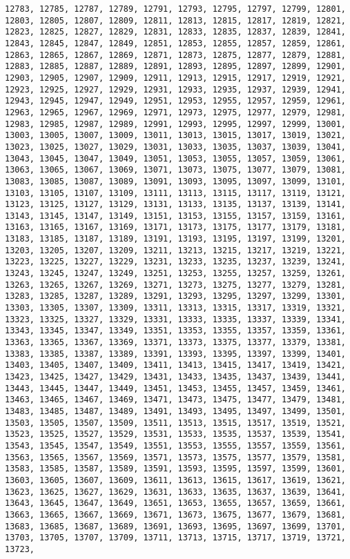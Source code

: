 \documentclass[11pt]{article}
\begin{document}
\begin{Verbatim}[commandchars=\\\{\}]
12783, 12785, 12787, 12789, 12791, 12793, 12795, 12797, 12799, 12801, 12803, 12805, 12807, 12809, 12811, 12813, 12815, 12817, 12819, 12821, 12823, 12825, 12827, 12829, 12831, 12833, 12835, 12837, 12839, 12841, 12843, 12845, 12847, 12849, 12851, 12853, 12855, 12857, 12859, 12861, 12863, 12865, 12867, 12869, 12871, 12873, 12875, 12877, 12879, 12881, 12883, 12885, 12887, 12889, 12891, 12893, 12895, 12897, 12899, 12901, 12903, 12905, 12907, 12909, 12911, 12913, 12915, 12917, 12919, 12921, 12923, 12925, 12927, 12929, 12931, 12933, 12935, 12937, 12939, 12941, 12943, 12945, 12947, 12949, 12951, 12953, 12955, 12957, 12959, 12961, 12963, 12965, 12967, 12969, 12971, 12973, 12975, 12977, 12979, 12981, 12983, 12985, 12987, 12989, 12991, 12993, 12995, 12997, 12999, 13001, 13003, 13005, 13007, 13009, 13011, 13013, 13015, 13017, 13019, 13021, 13023, 13025, 13027, 13029, 13031, 13033, 13035, 13037, 13039, 13041, 13043, 13045, 13047, 13049, 13051, 13053, 13055, 13057, 13059, 13061, 13063, 13065, 13067, 13069, 13071, 13073, 13075, 13077, 13079, 13081, 13083, 13085, 13087, 13089, 13091, 13093, 13095, 13097, 13099, 13101, 13103, 13105, 13107, 13109, 13111, 13113, 13115, 13117, 13119, 13121, 13123, 13125, 13127, 13129, 13131, 13133, 13135, 13137, 13139, 13141, 13143, 13145, 13147, 13149, 13151, 13153, 13155, 13157, 13159, 13161, 13163, 13165, 13167, 13169, 13171, 13173, 13175, 13177, 13179, 13181, 13183, 13185, 13187, 13189, 13191, 13193, 13195, 13197, 13199, 13201, 13203, 13205, 13207, 13209, 13211, 13213, 13215, 13217, 13219, 13221, 13223, 13225, 13227, 13229, 13231, 13233, 13235, 13237, 13239, 13241, 13243, 13245, 13247, 13249, 13251, 13253, 13255, 13257, 13259, 13261, 13263, 13265, 13267, 13269, 13271, 13273, 13275, 13277, 13279, 13281, 13283, 13285, 13287, 13289, 13291, 13293, 13295, 13297, 13299, 13301, 13303, 13305, 13307, 13309, 13311, 13313, 13315, 13317, 13319, 13321, 13323, 13325, 13327, 13329, 13331, 13333, 13335, 13337, 13339, 13341, 13343, 13345, 13347, 13349, 13351, 13353, 13355, 13357, 13359, 13361, 13363, 13365, 13367, 13369, 13371, 13373, 13375, 13377, 13379, 13381, 13383, 13385, 13387, 13389, 13391, 13393, 13395, 13397, 13399, 13401, 13403, 13405, 13407, 13409, 13411, 13413, 13415, 13417, 13419, 13421, 13423, 13425, 13427, 13429, 13431, 13433, 13435, 13437, 13439, 13441, 13443, 13445, 13447, 13449, 13451, 13453, 13455, 13457, 13459, 13461, 13463, 13465, 13467, 13469, 13471, 13473, 13475, 13477, 13479, 13481, 13483, 13485, 13487, 13489, 13491, 13493, 13495, 13497, 13499, 13501, 13503, 13505, 13507, 13509, 13511, 13513, 13515, 13517, 13519, 13521, 13523, 13525, 13527, 13529, 13531, 13533, 13535, 13537, 13539, 13541, 13543, 13545, 13547, 13549, 13551, 13553, 13555, 13557, 13559, 13561, 13563, 13565, 13567, 13569, 13571, 13573, 13575, 13577, 13579, 13581, 13583, 13585, 13587, 13589, 13591, 13593, 13595, 13597, 13599, 13601, 13603, 13605, 13607, 13609, 13611, 13613, 13615, 13617, 13619, 13621, 13623, 13625, 13627, 13629, 13631, 13633, 13635, 13637, 13639, 13641, 13643, 13645, 13647, 13649, 13651, 13653, 13655, 13657, 13659, 13661, 13663, 13665, 13667, 13669, 13671, 13673, 13675, 13677, 13679, 13681, 13683, 13685, 13687, 13689, 13691, 13693, 13695, 13697, 13699, 13701, 13703, 13705, 13707, 13709, 13711, 13713, 13715, 13717, 13719, 13721, 13723, 
\end{Verbatim}
\end{document}
